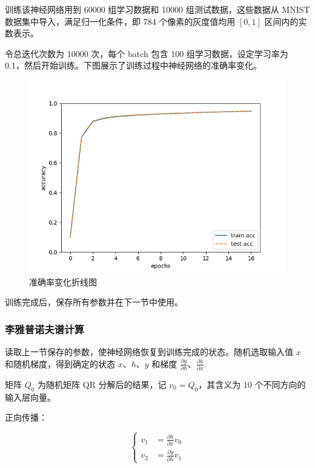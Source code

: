 训练该神经网络用到 60000 组学习数据和 10000 组测试数据，这些数据从 MNIST 数据集中导入，满足归一化条件，即 784 个像素的灰度值均用 $[0, 1]$ 区间内的实数表示。

令总迭代次数为 10000 次，每个 batch 包含 100 组学习数据，设定学习率为 0.1，然后开始训练。下图展示了训练过程中神经网络的准确率变化。

\begin{figure}[htbp]
  \centering
  \includegraphics[width=1\textwidth]{figures/output.png}
  \caption{准确率变化折线图}
  \label{fig:nn_lyapunov_exponents}
\end{figure}

训练完成后，保存所有参数并在下一节中使用。

\subsubsection{李雅普诺夫谱计算}

读取上一节保存的参数，使神经网络恢复到训练完成的状态。随机选取输入值 $x$ 和随机梯度，得到确定的状态 $x$、$h$、$y$ 和梯度 $\frac{\partial y}{\partial h}$、$\frac{\partial h}{\partial x}$.

矩阵 $Q_0$ 为随机矩阵 QR 分解后的结果，记 $v_0 = Q_0$，其含义为 10 个不同方向的输入层向量。

正向传播：

\begin{equation}
  \left\{
    \begin{aligned}
      v_1 &= \frac{\partial h}{\partial x} v_0 \\
      v_2 &= \frac{\partial y}{\partial h} v_1
    \end{aligned}
  \right.
\end{equation}

